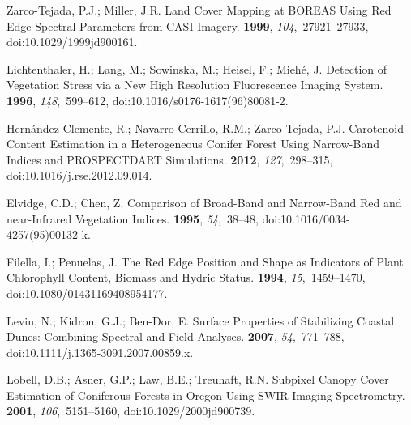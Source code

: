 \documentclass[remotesensing,article,accept,moreauthors,pdftex]{Definitions/mdpi}
\begin{document}
\begin{thebibliography}{999}
{Zarco-Tejada}, P.J.; Miller, J.R.
\newblock Land Cover Mapping at {{BOREAS}} Using Red Edge Spectral Parameters
  from {{CASI}} Imagery.
 {\bf 1999}, {\em
  104},~27921--27933, doi:10.1029/1999jd900161.

Lichtenthaler, H.; Lang, M.; Sowinska, M.; Heisel, F.; Mieh{\'e}, J.
\newblock Detection of Vegetation Stress via a New High Resolution Fluorescence
  Imaging System.
 {\bf 1996}, {\em 148},~599--612, doi:10.1016/s0176-1617(96)80081-2.

{Hern{\'a}ndez-Clemente}, R.; {Navarro-Cerrillo}, R.M.; {Zarco-Tejada}, P.J.
\newblock Carotenoid Content Estimation in a Heterogeneous Conifer Forest Using
  Narrow-Band Indices and {{PROSPECTDART}} Simulations.
 {\bf 2012}, {\em 127},~298--315, doi:10.1016/j.rse.2012.09.014.

Elvidge, C.D.; Chen, Z.
\newblock Comparison of Broad-Band and Narrow-Band Red and near-Infrared
  Vegetation Indices.
 {\bf 1995}, {\em 54},~38--48, doi:10.1016/0034-4257(95)00132-k.

Filella, I.; Penuelas, J.
\newblock The Red Edge Position and Shape as Indicators of Plant Chlorophyll
  Content, Biomass and Hydric Status.
 {\bf 1994}, {\em
  15},~1459--1470, doi:10.1080/01431169408954177.

Levin, N.; Kidron, G.J.; {Ben-Dor}, E.
\newblock Surface Properties of Stabilizing Coastal Dunes: Combining Spectral
  and Field Analyses.
 {\bf 2007}, {\em 54},~771--788, doi:10.1111/j.1365-3091.2007.00859.x.

Lobell, D.B.; Asner, G.P.; Law, B.E.; Treuhaft, R.N.
\newblock Subpixel Canopy Cover Estimation of Coniferous Forests in {{Oregon}}
  Using {{SWIR}} Imaging Spectrometry.
 {\bf 2001}, {\em
  106},~5151--5160, doi:10.1029/2000jd900739.


\end{thebibliography}
\end{document}
